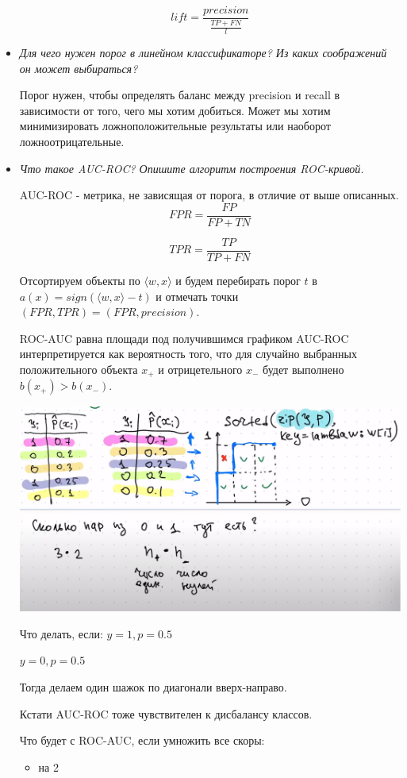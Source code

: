 \documentclass[a4paper]{article}
\begin{document}
\begin{itemize}
\[ lift = \frac{precision}{\frac{TP+FN}{l}} \]

\item \textit{Для чего нужен порог в линейном классификаторе? Из каких соображений он может
выбираться?}

Порог нужен, чтобы определять баланс между precision и recall в зависимости от того, чего мы хотим добиться.
Может мы хотим минимизировать ложноположительные результаты или наоборот ложноотрицательные.

\item \textit{Что такое AUC-ROC? Опишите алгоритм построения ROC-кривой.}

AUC-ROC - метрика, не зависящая от порога, в отличие от выше описанных.
\[ FPR = \frac{FP}{FP+TN} \]

\[ TPR = \frac{TP}{TP+FN} \]

Отсортируем объекты по $\langle w, x \rangle$ и будем перебирать порог $t$ в $a(x) = sign(\langle w, x \rangle - t)$ и отмечать точки $(FPR, TPR) = (FPR, precision)$.

ROC-AUC равна площади под получившимся графиком
AUC-ROC интерпретируется как вероятность того, что для случайно выбранных положительного объекта $x_+$ и отрицетельного $x_-$ будет выполнено $b(x_+) > b(x_-)$.


\includegraphics[width=18cm]{auc-roc.png}

Что делать, если:
$y = 1, p  = 0.5$

$y = 0, p = 0.5$

Тогда делаем один шажок по диагонали вверх-направо. 

Кстати AUC-ROC тоже чувствителен к дисбалансу классов.

Что будет с ROC-AUC, если умножить все скоры:

\begin{itemize}
\item на 2


\end{itemize}
\end{itemize}
\end{document}
